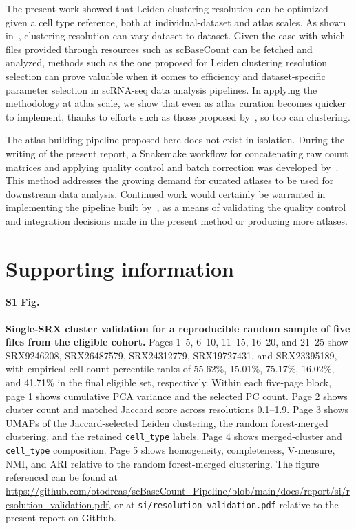 \documentclass[10pt,letterpaper]{article}
\begin{document}
The present work showed that Leiden clustering resolution can be optimized given a cell type reference, both at individual-dataset and atlas scales. As shown in~, clustering resolution can vary dataset to dataset. Given the ease with which files provided through resources such as scBaseCount can be fetched and analyzed, methods such as the one proposed for Leiden clustering resolution selection can prove valuable when it comes to efficiency and dataset-specific parameter selection in scRNA-seq data analysis pipelines. In applying the methodology at atlas scale, we show that even as atlas curation becomes quicker to implement, thanks to efforts such as those proposed by~\textcite{muellerBuildingOptimizedSinglecell2026}, so too can clustering.

The atlas building pipeline proposed here does not exist in isolation. During the writing of the present report, a Snakemake workflow for concatenating raw count matrices and applying quality control and batch correction was developed by~\textcite{muellerBuildingOptimizedSinglecell2026}. This method addresses the growing demand for curated atlases to be used for downstream data analysis. Continued work would certainly be warranted in implementing the pipeline built by~\cite{muellerBuildingOptimizedSinglecell2026}, as a means of validating the quality control and integration decisions made in the present method or producing more atlases.

\section*{Supporting information}

\paragraph*{S1 Fig.}
\label{S1_Fig}
\textbf{Single-SRX cluster validation for a reproducible random sample of five files from the eligible cohort.}
Pages 1--5, 6--10, 11--15, 16--20, and 21--25 show SRX9246208, SRX26487579, SRX24312779, SRX19727431, and SRX23395189, with empirical cell-count percentile ranks of 55.62\%, 15.01\%, 75.17\%, 16.02\%, and 41.71\% in the final eligible set, respectively. Within each five-page block, page 1 shows cumulative PCA variance and the selected PC count. Page 2 shows cluster count and matched Jaccard score across resolutions 0.1--1.9. Page 3 shows UMAPs of the Jaccard-selected Leiden clustering, the random forest-merged clustering, and the retained \texttt{cell_type} labels. Page 4 shows merged-cluster and \texttt{cell_type} composition. Page 5 shows homogeneity, completeness, V-measure, NMI, and ARI relative to the random forest-merged clustering. The figure referenced can be found at \url{https://github.com/otodreas/scBaseCount_Pipeline/blob/main/docs/report/si/resolution_validation.pdf}, or at \texttt{si/resolution_validation.pdf} relative to the present report on GitHub.
\end{document}
